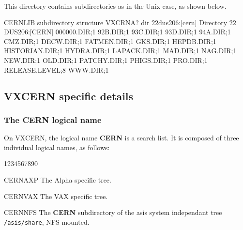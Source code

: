 This directory contains subdirectories as in the Unix case,
as shown below.
\begin{XMPt}{CERNLIB subdirectory structure}
VXCRNA? dir $22$dus206:[cern]
Directory $22$DUS206:[CERN]
000000.DIR;1        92B.DIR;1           93C.DIR;1           93D.DIR;1
94A.DIR;1           CMZ.DIR;1           DECW.DIR;1          FATMEN.DIR;1
GKS.DIR;1           HEPDB.DIR;1         HISTORIAN.DIR;1     HYDRA.DIR;1
LAPACK.DIR;1        MAD.DIR;1           NAG.DIR;1           NEW.DIR;1
OLD.DIR;1           PATCHY.DIR;1        PHIGS.DIR;1         PRO.DIR;1
RELEASE.LEVEL;8     WWW.DIR;1
\end{XMPt}

\subsection{VXCERN specific details}
\label{sect-VXCERN}

\subsubsection{The {\bf CERN} logical name}

On VXCERN, the logical name {\bf CERN} is a search list. It is composed
of three individual logical names, as follows:

\begin{DLtt}{1234567890}
\item[CERNAXP]The Alpha specific tree.
\item[CERNVAX]The VAX specific tree.
\item[CERNNFS]The {\bf CERN} subdirectory of the asis system 
independant tree {\tt /asis/share}, NFS mounted.
\end{DLtt}


